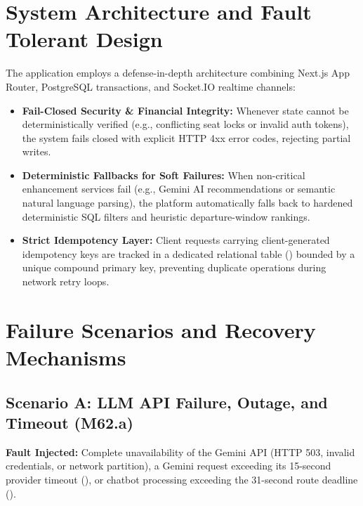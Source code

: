 \documentclass[10pt]{article}
\begin{document}
\section{System Architecture and Fault Tolerant Design}
The application employs a defense-in-depth architecture combining Next.js App Router, PostgreSQL transactions, and Socket.IO realtime channels:
\begin{itemize}
  \item \textbf{Fail-Closed Security \& Financial Integrity:} Whenever state cannot be deterministically verified (e.g., conflicting seat locks or invalid auth tokens), the system fails closed with explicit HTTP 4xx error codes, rejecting partial writes.
  \item \textbf{Deterministic Fallbacks for Soft Failures:} When non-critical enhancement services fail (e.g., Gemini AI recommendations or semantic natural language parsing), the platform automatically falls back to hardened deterministic SQL filters and heuristic departure-window rankings.
  \item \textbf{Strict Idempotency Layer:} Client requests carrying client-generated idempotency keys are tracked in a dedicated relational table () bounded by a unique compound primary key, preventing duplicate operations during network retry loops.
\end{itemize}

\section{Failure Scenarios and Recovery Mechanisms}

\subsection{Scenario A: LLM API Failure, Outage, and Timeout (M62.a)}
\textbf{Fault Injected:} Complete unavailability of the Gemini API (HTTP 503, invalid credentials, or network partition), a Gemini request exceeding its 15-second provider timeout (), or chatbot processing exceeding the 31-second route deadline ().
\end{document}
